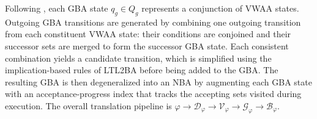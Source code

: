 \documentclass[lettersize,journal]{IEEEtran}
\theoremstyle{italiclemma}
\theoremstyle{italiclemma}
\theoremstyle{definition}
\begin{document}
Following \cite{Gastin2001FastLT}, each GBA state \(q_g \in Q_g \) represents a conjunction of VWAA states. Outgoing GBA transitions are generated by combining one outgoing transition from each constituent VWAA state: their conditions are conjoined and their successor sets are merged to form the successor GBA state. Each consistent combination yields a candidate transition, which is simplified using the implication-based rules of LTL2BA before being added to the GBA. The resulting GBA is then degeneralized into an NBA by augmenting each GBA state with an acceptance-progress index that tracks the accepting sets visited during execution. The overall translation pipeline is $ \varphi \rightarrow \mathcal{D}_\varphi \rightarrow \mathcal{V}_\varphi
\rightarrow \mathcal{G}_\varphi \rightarrow \mathcal{B}_\varphi. $


\end{document}
